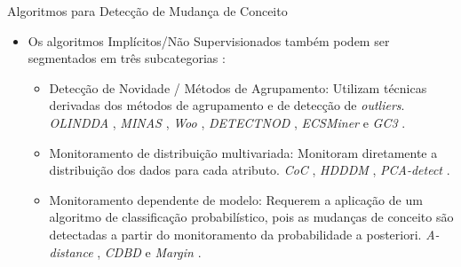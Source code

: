 \documentclass[10pt]{beamer}
\begin{document}
\begin{frame}{Algoritmos para Detecção de Mudança de Conceito}
    \begin{itemize}
        \item<1 -> Os algoritmos \alert{Implícitos/Não Supervisionados} também podem ser segmentados em três subcategorias \cite{GONCALVES20148144}:
        \begin{itemize}
        \item<2 -> \alert{Detecção de Novidade / Métodos de Agrupamento}: Utilizam técnicas derivadas dos métodos de agrupamento e de detecção de \textit{outliers}. \textit{OLINDDA} \cite{Spinosa:2007:OCA:1244002.1244107}, \textit{MINAS} \cite{Faria:2013:NDA:2480362.2480515}, \textit{Woo} \cite{Ryu:Kantardzic:2012}, \textit{DETECTNOD} \cite{Hashemi:Hayat:DETECTNOD:2010}, \textit{ECSMiner} \cite{Masud:2011:CNC:1978259.1978529} e \textit{GC3} \cite{Sethi2016b:GC3}.
        \item<3 -> \alert{Monitoramento de distribuição multivariada}: Monitoram diretamente a distribuição dos dados para cada atributo. \textit{CoC} \cite{Lee:Magoules:CoC:2012}, \textit{HDDDM} \cite{Ditzler:Polikar:HDDDM:2011}, \textit{PCA-detect} \cite{Kuncheva:PCADetect:20085}.
        \item<4 -> \alert{Monitoramento dependente de modelo}: Requerem a aplicação de um algoritmo de classificação probabilístico, pois as mudanças de conceito são detectadas a partir do monitoramento da probabilidade a posteriori. \textit{A-distance} \cite{Dredze:ADistance:2010585}, \textit{CDBD} \cite{Lindstrom:CDBD:2013} e \textit{Margin} \cite{Dries:Margin:2009}.
        \end{itemize}
    \end{itemize}
\end{frame}
\end{document}
